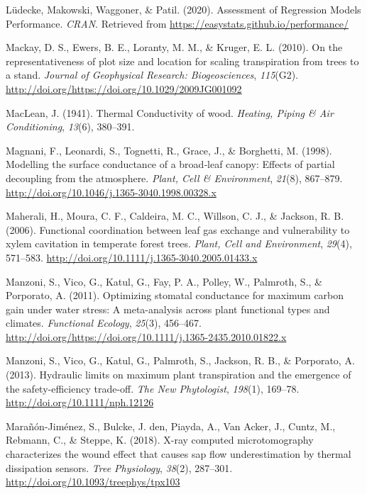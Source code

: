 \documentclass[11pt,twoside]{reedthesis}
\begin{document}
\hypertarget{ref-ludecke_assessment_2020}{}
Lüdecke, Makowski, Waggoner, \& Patil. (2020). Assessment of Regression
Models Performance. \emph{CRAN}. Retrieved from
\url{https://easystats.github.io/performance/}

\hypertarget{ref-Mackay2010}{}
Mackay, D. S., Ewers, B. E., Loranty, M. M., \& Kruger, E. L. (2010). On
the representativeness of plot size and location for scaling
transpiration from trees to a stand. \emph{Journal of Geophysical
Research: Biogeosciences}, \emph{115}(G2).
\url{http://doi.org/https://doi.org/10.1029/2009JG001092}

\hypertarget{ref-MacLean1941}{}
MacLean, J. (1941). Thermal Conductivity of wood. \emph{Heating, Piping
\& Air Conditioning}, \emph{13}(6), 380--391.

\hypertarget{ref-magnani_modelling_1998}{}
Magnani, F., Leonardi, S., Tognetti, R., Grace, J., \& Borghetti, M.
(1998). Modelling the surface conductance of a broad‐leaf canopy:
Effects of partial decoupling from the atmosphere. \emph{Plant, Cell \&
Environment}, \emph{21}(8), 867--879.
\url{http://doi.org/10.1046/j.1365-3040.1998.00328.x}

\hypertarget{ref-maherali_functional_2006}{}
Maherali, H., Moura, C. F., Caldeira, M. C., Willson, C. J., \& Jackson,
R. B. (2006). Functional coordination between leaf gas exchange and
vulnerability to xylem cavitation in temperate forest trees.
\emph{Plant, Cell and Environment}, \emph{29}(4), 571--583.
\url{http://doi.org/10.1111/j.1365-3040.2005.01433.x}

\hypertarget{ref-Manzoni2011}{}
Manzoni, S., Vico, G., Katul, G., Fay, P. A., Polley, W., Palmroth, S.,
\& Porporato, A. (2011). Optimizing stomatal conductance for maximum
carbon gain under water stress: A meta-analysis across plant functional
types and climates. \emph{Functional Ecology}, \emph{25}(3), 456--467.
\url{http://doi.org/https://doi.org/10.1111/j.1365-2435.2010.01822.x}

\hypertarget{ref-Manzoni2013}{}
Manzoni, S., Vico, G., Katul, G., Palmroth, S., Jackson, R. B., \&
Porporato, A. (2013). Hydraulic limits on maximum plant transpiration
and the emergence of the safety-efficiency trade-off. \emph{The New
Phytologist}, \emph{198}(1), 169--78.
\url{http://doi.org/10.1111/nph.12126}

\hypertarget{ref-Maranon-jimenez2018}{}
Marañón-Jiménez, S., Bulcke, J. den, Piayda, A., Van Acker, J., Cuntz,
M., Rebmann, C., \& Steppe, K. (2018). X-ray computed microtomography
characterizes the wound effect that causes sap flow underestimation by
thermal dissipation sensors. \emph{Tree Physiology}, \emph{38}(2),
287--301. \url{http://doi.org/10.1093/treephys/tpx103}
\end{document}
